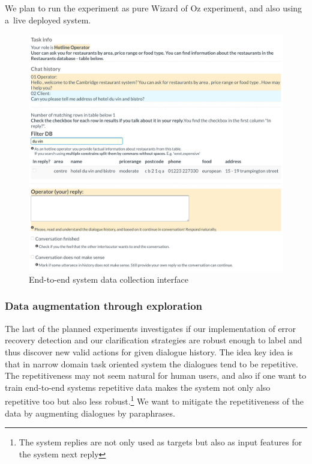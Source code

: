 \documentclass[11pt]{article}
\begin{document}
We plan to run the experiment as pure Wizard of Oz experiment, and also using a~live deployed system.

\begin{figure}[!tb]
    \centering
    \includegraphics[width=1.0\linewidth]{gui-annotators-system}
    \caption{End-to-end system data collection interface}
\label{fig:wochat}
\end{figure}

\subsubsection*{Data augmentation through exploration}
The last of the planned experiments investigates if our implementation of error recovery detection and our clarification strategies are robust enough to label and thus discover new valid actions for given dialogue history.
The idea key idea is that in narrow domain task oriented system the dialogues tend to be repetitive.
The repetitiveness may not seem natural for human users, and also if one want to train end-to-end systems repetitive data makes the system not only also repetitive too but also less robust.\footnote{The system replies are not only used as targets but also as input features for the system next reply} 
We want to mitigate the repetitiveness of the data by augmenting dialogues by paraphrases.
\end{document}
